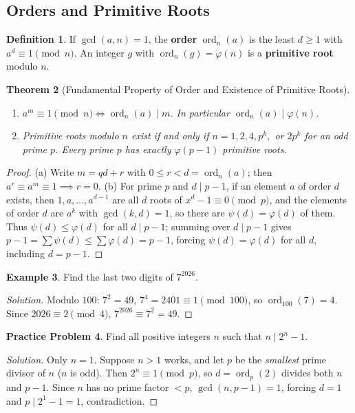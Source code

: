 \documentclass[11pt]{article}
\theoremstyle{plain}
\newtheorem{theorem}{Theorem}[section]
\theoremstyle{definition}
\newtheorem{definition}[theorem]{Definition}
\newtheorem{example}[theorem]{Example}
\newtheorem{problem}[theorem]{Practice Problem}
\newenvironment{solution}{\begin{proof}[Solution]}{\end{proof}}
\newcommand{\ord}{\operatorname{ord}}
\begin{document}
\subsection{Orders and Primitive Roots}

\begin{definition}
If $\gcd(a, n) = 1$, the \textbf{order} $\ord_n(a)$ is the least $d \ge 1$
with $a^d \equiv 1 \pmod n$. An integer $g$ with $\ord_n(g) = \varphi(n)$ is a \textbf{primitive root} modulo $n$.
\end{definition}

\begin{theorem}[Fundamental Property of Order and Existence of Primitive Roots]\label{thm:order}
\leavevmode
\begin{enumerate}[label=(\alph*)]
\item $a^m \equiv 1 \pmod n \iff \ord_n(a) \mid m$. In particular $\ord_n(a) \mid \varphi(n)$.
\item Primitive roots modulo $n$ exist if and only if $n = 1, 2, 4, p^k,$ or $2p^k$ for an odd prime $p$. Every prime $p$ has exactly $\varphi(p-1)$ primitive roots.
\end{enumerate}
\end{theorem}
\begin{proof}
(a) Write $m = qd + r$ with $0 \le r < d = \ord_n(a)$; then $a^r \equiv a^m \equiv 1 \implies r = 0$.
(b) For prime $p$ and $d \mid p-1$, if an element $a$ of order $d$ exists, then $1, a, \dots, a^{d-1}$ are all $d$ roots of $x^d - 1 \equiv 0 \pmod p$, and the elements of order $d$ are $a^k$ with $\gcd(k,d)=1$, so there are $\psi(d) = \varphi(d)$ of them. Thus $\psi(d) \le \varphi(d)$ for all $d \mid p-1$; summing over $d \mid p-1$ gives $p-1 = \sum \psi(d) \le \sum \varphi(d) = p-1$, forcing $\psi(d) = \varphi(d)$ for all $d$, including $d = p-1$.
\end{proof}

\begin{example}
Find the last two digits of $7^{2026}$.
\end{example}
\begin{solution}
Modulo $100$: $7^2 = 49$, $7^4 = 2401 \equiv 1 \pmod{100}$, so $\ord_{100}(7) = 4$. Since $2026 \equiv 2 \pmod 4$, $7^{2026} \equiv 7^2 = 49$.
\end{solution}

\begin{problem}
Find all positive integers $n$ such that $n \mid 2^n - 1$.
\end{problem}
\begin{solution}
Only $n = 1$. Suppose $n > 1$ works, and let $p$ be the \emph{smallest} prime
divisor of $n$ ($n$ is odd). Then $2^n \equiv 1 \pmod p$, so $d = \ord_p(2)$ divides both $n$ and $p-1$. Since $n$ has no prime factor $< p$, $\gcd(n, p-1) = 1$, forcing $d = 1$ and $p \mid 2^1 - 1 = 1$, contradiction.
\end{solution}
\end{document}
